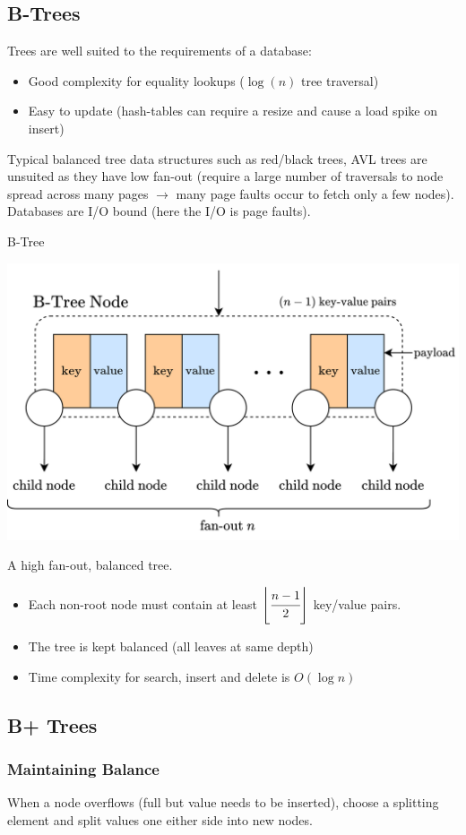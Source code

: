 \subsection{B-Trees}
Trees are well suited to the requirements of a database:
\begin{itemize}
    \item Good complexity for equality lookups ($\log(n)$ tree traversal)
    \item Easy to update (hash-tables can require a resize and cause a load spike on insert)
\end{itemize}
Typical balanced tree data structures such as red/black trees, AVL trees are unsuited as they have low fan-out
(require a large number of traversals to node spread across many pages $\to$ many page faults occur to fetch only a
few nodes). Databases are I/O bound (here the I/O is page faults).

\begin{definitionbox}{B-Tree}
    \begin{center}
        \includegraphics[width=.6\textwidth]{algorithms_and_indices/images/b_tree_node.drawio.png}
    \end{center}
    A high fan-out, balanced tree.
    \begin{itemize}
        \item Each non-root node must contain at least $\left\lfloor \cfrac{n-1}{2} \right\rfloor$ key/value pairs.
        \item The tree is kept balanced (all leaves at same depth)
        \item Time complexity for search, insert and delete is $O(\log n)$
    \end{itemize}
\end{definitionbox}

\subsection{B+ Trees}
\unfinished

\subsubsection{Maintaining Balance}
When a node overflows (full but value needs to be inserted), choose a splitting element and split values one either side into new nodes.
\\ \unfinished

